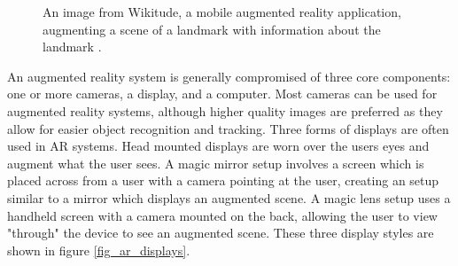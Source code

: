 \documentclass[oneside,11pt]{Latex/Classes/PhDthesisPSnPDF}
\begin{document}
\begin{figure}[h!]
  \caption{\label{fig_wikitude_example} An image from Wikitude, a mobile augmented reality application, augmenting a scene of a landmark with information about the landmark \cite{wikitude_11}.} 
\end{figure}

An augmented reality system is generally compromised of three core components: one or more cameras, a display, and a computer.  Most cameras can be used for augmented reality systems, although higher quality images are preferred as they allow for easier object recognition and tracking.  Three forms of displays are often used in AR systems.  Head mounted displays are worn over the users eyes and augment what the user sees.  A magic mirror setup involves a screen which is placed across from a user with a camera pointing at the user, creating an setup similar to a mirror which displays an augmented scene.  A magic lens setup uses a handheld screen with a camera mounted on the back, allowing the user to view "through" the device to see an augmented scene.  These three display styles are shown in figure \ref{fig_ar_displays}.  
 
\end{document}
